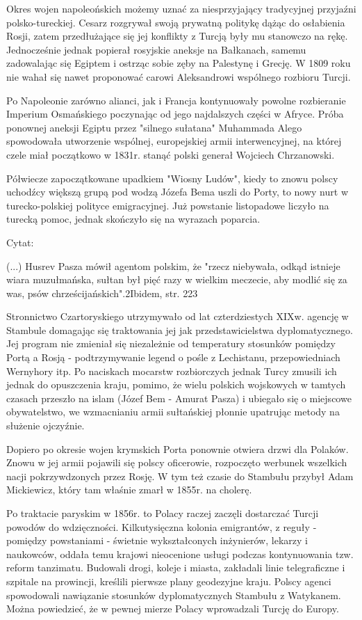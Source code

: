 Okres wojen napoleońskich możemy uznać za niesprzyjający tradycyjnej przyjaźni polsko-tureckiej. Cesarz rozgrywał swoją prywatną politykę dążąc do osłabienia Rosji, zatem przedłużające się jej konflikty z Turcją były mu stanowczo na rękę. Jednocześnie jednak popierał rosyjskie aneksje na Bałkanach, samemu zadowalając się Egiptem i ostrząc sobie zęby na Palestynę i Grecję. W 1809 roku nie wahał się nawet proponować carowi Aleksandrowi wspólnego rozbioru Turcji.

Po Napoleonie zarówno alianci, jak i Francja kontynuowały powolne rozbieranie Imperium Osmańskiego poczynając od jego najdalszych części w Afryce. Próba ponownej aneksji Egiptu przez "silnego sułatana" Muhammada Alego spowodowała utworzenie wspólnej, europejskiej armii interwencyjnej, na której czele miał początkowo w 1831r. stanąć polski generał Wojciech Chrzanowski.

Półwiecze zapoczątkowane upadkiem "Wiosny Ludów", kiedy to znowu polscy uchodźcy większą grupą pod wodzą Józefa Bema uszli do Porty, to nowy nurt w turecko-polskiej polityce emigracyjnej. Już powstanie listopadowe liczyło na turecką pomoc, jednak skończyło się na wyrazach poparcia.

Cytat:


	(...) Husrev Pasza mówił agentom polskim, że "rzecz niebywała, odkąd istnieje wiara muzułmańska, sułtan był pięć razy w wielkim meczecie, aby modlić się za was, psów chrześcijańskich".2Ibidem, str. 223

Stronnictwo Czartoryskiego utrzymywało od lat czterdziestych XIXw. agencję w Stambule domagając się traktowania jej jak przedstawicielstwa dyplomatycznego. Jej program nie zmieniał się niezależnie od temperatury stosunków pomiędzy Portą a Rosją - podtrzymywanie legend o pośle z Lechistanu, przepowiedniach Wernyhory itp. Po naciskach mocarstw rozbiorczych jednak Turcy zmusili ich jednak do opuszczenia kraju, pomimo, że wielu polskich wojskowych w tamtych czasach przeszło na islam (Józef Bem - Amurat Pasza) i ubiegało się o miejscowe obywatelstwo, we wzmacnianiu armii sułtańskiej płonnie upatrując metody na służenie ojczyźnie. 

Dopiero po okresie wojen krymskich Porta ponownie otwiera drzwi dla Polaków. Znowu w jej armii pojawili się polscy oficerowie, rozpoczęto werbunek wszelkich nacji pokrzywdzonych przez Rosję. W tym też czasie do Stambułu przybył Adam Mickiewicz, który tam właśnie zmarł w 1855r. na cholerę. 

Po traktacie paryskim w 1856r. to Polacy raczej zaczęli dostarczać Turcji powodów do wdzięczności. Kilkutysięczna kolonia emigrantów, z reguły - pomiędzy powstaniami - świetnie wykształconych inżynierów, lekarzy i naukowców, oddała temu krajowi nieocenione usługi podczas kontynuowania tzw. reform tanzimatu. Budowali drogi, koleje i miasta, zakładali linie telegraficzne i szpitale na prowincji, kreślili pierwsze plany geodezyjne kraju. Polscy agenci spowodowali nawiązanie stosunków dyplomatycznych Stambułu z Watykanem. Można powiedzieć, że w pewnej mierze Polacy wprowadzali Turcję do Europy.

